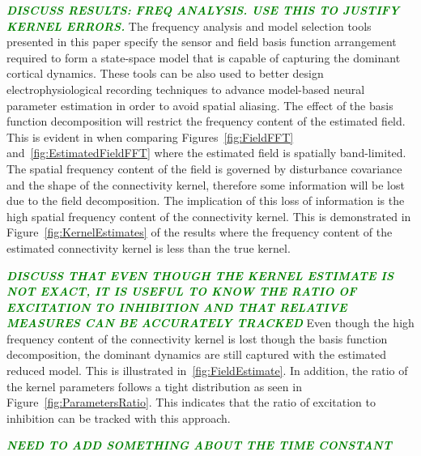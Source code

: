 \documentclass[12pt]{iopart}
\newcommand{\omg}[1]{\textsf{\emph{\textbf{\textcolor{green}{#1}}}}}
\begin{document}
\omg{DISCUSS RESULTS: FREQ ANALYSIS. USE THIS TO JUSTIFY KERNEL ERRORS.}
The frequency analysis and model selection tools presented in this paper specify the sensor and field basis function arrangement required to form a state-space model that is capable of capturing the dominant cortical dynamics. These tools can be also used to better design electrophysiological recording techniques to advance model-based neural parameter estimation in order to avoid spatial aliasing. The effect of the basis function decomposition will restrict the frequency content of the estimated field. This is evident in when comparing Figures~\ref{fig:FieldFFT} and~\ref{fig:EstimatedFieldFFT} where the estimated field is spatially band-limited. The spatial frequency content of the field is governed by disturbance covariance and the shape of the connectivity kernel, therefore some information will be lost due to the field decomposition. The implication of this loss of information is the high spatial frequency content of the connectivity kernel. This is demonstrated in Figure~\ref{fig:KernelEstimates} of the results where the frequency content of the estimated connectivity kernel is less than the true kernel.

\omg{DISCUSS THAT EVEN THOUGH THE KERNEL ESTIMATE IS NOT EXACT, IT IS USEFUL TO KNOW THE RATIO OF EXCITATION TO INHIBITION AND THAT RELATIVE MEASURES CAN BE ACCURATELY TRACKED}
Even though the high frequency content of the connectivity kernel is lost though the basis function decomposition, the dominant dynamics are still captured with the estimated reduced model. This is illustrated in~\ref{fig:FieldEstimate}. In addition, the ratio of the kernel parameters follows a tight distribution as seen in Figure~\ref{fig:ParametersRatio}. This indicates that the ratio of excitation to inhibition can be tracked with this approach. 

\omg{NEED TO ADD SOMETHING ABOUT THE TIME CONSTANT }
\end{document}
